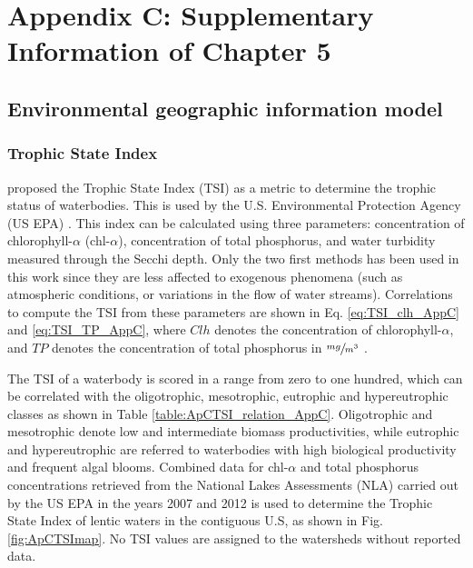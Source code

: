 \chapter{Appendix C: Supplementary Information of Chapter 5}

\begin{refsection}[referencesCh4]
\section{Environmental geographic information model}
\subsection{Trophic State Index}
\citet{carlson_trophic_1977} proposed the Trophic State Index (TSI) as a metric to determine the trophic status of waterbodies. This is used by the U.S. Environmental Protection Agency (US EPA) \citep{QAPP2012}. This index can be calculated using three parameters: concentration of chlorophyll-$\alpha$ (chl-$\alpha$), concentration of total phosphorus, and water turbidity measured through the Secchi depth. Only the two first methods has been used in this work since they are less affected to exogenous phenomena (such as atmospheric conditions, or variations in the flow of water streams). Correlations to compute the TSI from these parameters are shown in Eq. \ref{eq:TSI_clh_AppC} and \ref{eq:TSI_TP_AppC}, where $Clh$ denotes the concentration of chlorophyll-$\alpha$, and $TP$ denotes the concentration of total phosphorus in $\sfrac{mg}{m^3}$ \citep{carlson_trophic_1977}. 

The TSI of a waterbody is scored in a range from zero to one hundred, which can be correlated with the oligotrophic, mesotrophic, eutrophic and hypereutrophic classes as shown in Table \ref{table:ApCTSI_relation_AppC}. Oligotrophic and mesotrophic denote low and intermediate biomass productivities, while eutrophic and hypereutrophic are referred to waterbodies with high biological productivity and frequent algal blooms. Combined data for chl-$\alpha$ and total phosphorus concentrations retrieved from the National Lakes Assessments (NLA) carried out by the US EPA in the years 2007 and 2012 \citep{NLA2012, NLA2007} is used to determine the Trophic State Index of lentic waters in the contiguous U.S, as shown in Fig. \ref{fig:ApCTSImap}. No TSI values are assigned to the watersheds without reported data.


\end{refsection}
